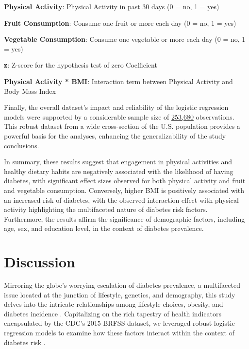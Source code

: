 \documentclass[11pt]{article}
\begin{document}
\begin{table}[h]
\begin{threeparttable}
\begin{tablenotes}
\item \textbf{Physical Activity}: Physical Activity in past 30 days (0 = no, 1 = yes)
\item \textbf{Fruit Consumption}: Consume one fruit or more each day (0 = no, 1 = yes)
\item \textbf{Vegetable Consumption}: Consume one vegetable or more each day (0 = no, 1 = yes)
\item \textbf{z}: Z-score for the hypothesis test of zero Coefficient
\item \textbf{Physical Activity * BMI}: Interaction term between Physical Activity and Body Mass Index
\end{tablenotes}
\end{threeparttable}
\end{table}


Finally, the overall dataset's impact and reliability of the logistic regression models were supported by a considerable sample size of \hyperlink{R0a}{253,680} observations. This robust dataset from a wide cross-section of the U.S. population provides a powerful basis for the analyses, enhancing the generalizability of the study conclusions.

In summary, these results suggest that engagement in physical activities and healthy dietary habits are negatively associated with the likelihood of having diabetes, with significant effect sizes observed for both physical activity and fruit and vegetable consumption. Conversely, higher BMI is positively associated with an increased risk of diabetes, with the observed interaction effect with physical activity highlighting the multifaceted nature of diabetes risk factors. Furthermore, the results affirm the significance of demographic factors, including age, sex, and education level, in the context of diabetes prevalence.

\section*{Discussion}

Mirroring the globe's worrying escalation of diabetes prevalence, a multifaceted issue located at the junction of lifestyle, genetics, and demography, this study delves into the intricate relationships among lifestyle choices, obesity, and diabetes incidence \cite{Bellou2018RiskFF, Chan1994ObesityFD}. Capitalizing on the rich tapestry of health indicators encapsulated by the CDC's 2015 BRFSS dataset, we leveraged robust logistic regression models to examine how these factors interact within the context of diabetes risk \cite{Menard1996AppliedLR}.
\end{document}
